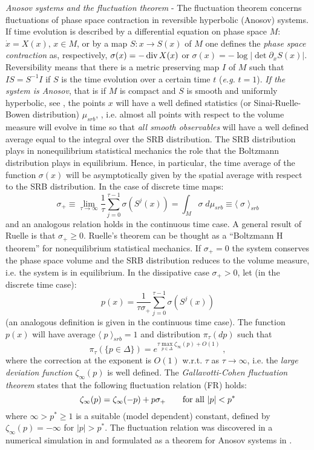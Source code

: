 \documentclass[pre,aps]{revtex4}
\newcommand{\beq}{\begin{equation}}
\newcommand{\eeq}{\end{equation}}
\newcommand{\ie}{i.e. }
\let\z=\zeta  \let\h=\eta   \let\th=\theta \let\k=\kappa \let\l=\lambda
\let\s=\sigma \let\t=\tau   \let\f=\varphi \let\c=\chi
\let\io=\infty
\begin{document}
\vskip10pt
\noindent
{\it Anosov systems and the fluctuation theorem} - 
The fluctuation theorem concerns fluctuations of phase space
contraction in reversible hyperbolic (Anosov) systems. If time evolution is
described by a differential equation on phase space $M$: $\dot
x=X(x),\, x\in M$,
or by a map $S: x\rightarrow S(x)$ of $M$ one defines the {\it phase space
contraction} as, respectively, $\sigma(x)=-{\rm \,div\,} X(x)$ or
$\sigma(x)=-\log |\det\partial_x S(x)|$. Reversibility means that there is a
metric preserving map $I$ of $M$ such that $IS=S^{-1}I$ if $S$ is the
time evolution over a certain time $t$ ({\it e.g.} $t=1$).
{\it If the system is Anosov}, that is if $M$ is compact and $S$ is smooth
and uniformly hyperbolic, see \cite{Ga99,GC95a,GC95b,Ga95c,Ru99}, 
the points $x$ will have a well defined
statistics (or Sinai-Ruelle-Bowen distribution) $\mu_{srb}$, \cite{Ru99}, 
\ie almost all points 
with respect to the volume measure will evolve in time
so that {\it all smooth observables} will have a well defined average
equal to the integral over the SRB distribution. 
The SRB distribution plays in nonequilibrium statistical mechanics the role
that the Boltzmann distribution plays in equilibrium.
Hence, in particular,
the time average of the function $\sigma(x)$ 
will be asymptotically given by the spatial average with respect to 
the SRB distribution. In the case of discrete time maps:
\beq
\label{1.1}
\sigma_+\equiv\lim_{\t\to\io} \frac1\t \sum_{j=0}^{\tau-1} \sigma(S^j(x))
=\int_M \sigma\;d\mu_{srb} \equiv \langle\; \sigma \;\rangle_{srb}\eeq
and an analogous relation holds in the continuous time case.
A general result of Ruelle \cite{Ru99} is that $\s_+ \geq 0$. 
Ruelle's theorem can be thought as a ``Boltzmann H theorem'' for nonequilibrium
statistical mechanics. 
If $\s_+=0$ the system conserves the phase space volume and the SRB distribution
reduces to the volume measure, \ie the system is in equilibrium.
In the dissipative case $\sigma_+ > 0$, let (in the discrete time case):
\beq
\label{FTC1}
p(x)=\frac{1}{\tau \sigma_+} \sum_{j=0}^{\tau-1} \sigma(S^j(x))
\eeq
(an analogous definition is given 
in the continuous time case).
The function $p(x)$ will have average $\langle\; p\;\rangle_{srb} = 1$
and distribution $\pi_\tau(dp)$ such that
\beq
\label{FTC2}
\pi_\tau(\{p\in \Delta\})= e^{\tau \max_{p\in\Delta}\zeta_\infty(p)+ O(1)}\;,
\eeq
where the correction at the exponent is $O(1)$ w.r.t. $\t$ as $\t\to\io$,
\ie the {\it large deviation function} $\z_\io(p)$ is well defined.
The {\it Gallavotti-Cohen fluctuation theorem} states that the following 
fluctuation relation (FR) holds:
\beq
\label{FTC3}
\zeta_\infty(p)=\zeta_\infty(-p)+p \sigma_+ \qquad{\rm for\ all}\ |p|<p^*
\eeq
where $\infty> p^*\ge1$ is a suitable (model dependent) constant, defined
by $\z_\io(p) = -\io$ for $|p|> p^*$. The fluctuation relation was discovered 
in a numerical simulation in \cite{ECM93} and formulated as a theorem for 
Anosov systems in \cite{GC95a}.
\end{document}
